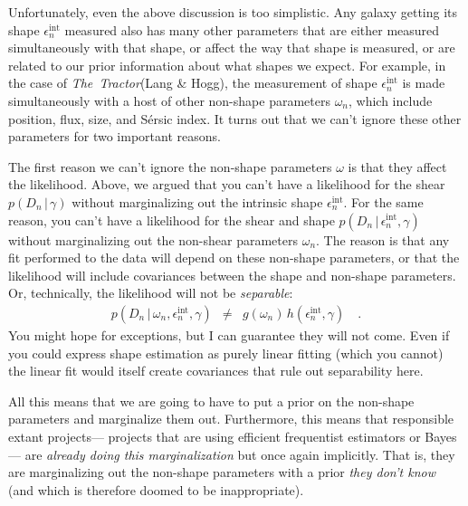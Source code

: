\documentclass[12pt]{article}
\newcommand{\project}[1]{\textsl{#1}}
\newcommand{\thetractor}{\project{The~Tractor}}
\newcommand{\given}{\,|\,}
\newcommand{\data}{D}
\newcommand{\shear}{\gamma}
\newcommand{\ellip}{\epsilon}
\newcommand{\intrinsic}{\ellip^{\mathrm{int}}}
\newcommand{\nspars}{\omega}
\begin{document}
Unfortunately, even the above discussion is too simplistic.
Any galaxy getting its shape $\intrinsic_n$ measured
  also has many other parameters that are either measured simultaneously with that shape,
  or affect the way that shape is measured,
  or are related to our prior information about what shapes we expect.
For example, in the case of \thetractor (Lang \& Hogg),
  the measurement of shape $\intrinsic_n$ is made simultaneously with a host of other
  non-shape parameters $\nspars_n$,
  which include position, flux, size, and S\'ersic index.
It turns out that we can't ignore these other parameters for two important reasons.

The first reason we can't ignore the non-shape parameters $\nspars$ is that they affect the likelihood.
Above, we argued that you can't have a likelihood for the shear $p(\data_n\given\shear)$ 
  without marginalizing out the intrinsic shape $\intrinsic_n$.
For the same reason, you can't have a likelihood for the shear and shape $p(\data_n\given\intrinsic_n,\shear)$
  without marginalizing out the non-shear parameters $\nspars_n$.
The reason is that any fit performed to the data will depend on these non-shape parameters,
  or that the likelihood will include covariances between the shape and non-shape parameters.
Or, technically, the likelihood will not be \emph{separable}:
\begin{eqnarray}
p(\data_n\given\nspars_n,\intrinsic_n,\shear)
  &\ne& g(\nspars_n)\,h(\intrinsic_n,\shear)
  \quad .
\end{eqnarray}
You might hope for exceptions, but I can guarantee they will not come.
Even if you could express shape estimation as purely linear fitting
  (which you cannot)
  the linear fit would itself create covariances that rule out separability here.

All this means that we are going to have to put a prior on the non-shape parameters
  and marginalize them out.
Furthermore, this means that responsible extant projects---%
  projects that are using efficient frequentist estimators or Bayes---%
  are \emph{already doing this marginalization} but once again implicitly.
That is, they are marginalizing out the non-shape parameters with a prior \emph{they don't know}
  (and which is therefore doomed to be inappropriate).
\end{document}
